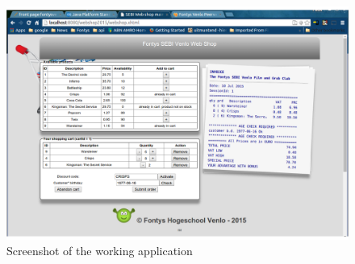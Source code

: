% 
\nolinenumbers
\begin{figure}[H]
\includegraphics[width=.9\linewidth]{figures/screenshot.png}
\caption{\label{fig:screenshot}Screenshot of the working application}
\end{figure}
\tableofcontents
\newpage
{}
\linenumbers





\afterpage{\clearpage}


%


\label{lastpage}
%
